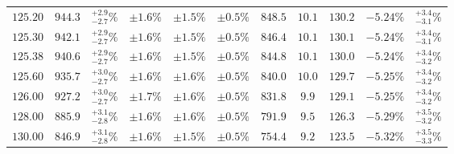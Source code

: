 \begin{table}[ht!]
{{\begin{tabular}{| cc | c | ccc | cccc | c |}
$125.20$ & $944.3$ & $^{+2.9}_{-2.7}\%$ & $\pm 1.6\%$ & {\color{black!55}$\pm 1.5\%$} & {\color{black!55}$\pm 0.5\%$} & $848.5$ & $10.1$ & $130.2$ & $-5.24\%$ & $^{+3.4}_{-3.1}\%$ \\
$125.30$ & $942.1$ & $^{+2.9}_{-2.7}\%$ & $\pm 1.6\%$ & {\color{black!55}$\pm 1.5\%$} & {\color{black!55}$\pm 0.5\%$} & $846.4$ & $10.1$ & $130.1$ & $-5.24\%$ & $^{+3.4}_{-3.1}\%$ \\
$125.38$ & $940.6$ & $^{+2.9}_{-2.7}\%$ & $\pm 1.6\%$ & {\color{black!55}$\pm 1.5\%$} & {\color{black!55}$\pm 0.5\%$} & $844.8$ & $10.1$ & $130.0$ & $-5.24\%$ & $^{+3.4}_{-3.2}\%$ \\
$125.60$ & $935.7$ & $^{+3.0}_{-2.7}\%$ & $\pm 1.6\%$ & {\color{black!55}$\pm 1.6\%$} & {\color{black!55}$\pm 0.5\%$} & $840.0$ & $10.0$ & $129.7$ & $-5.25\%$ & $^{+3.4}_{-3.2}\%$ \\
$126.00$ & $927.2$ & $^{+3.0}_{-2.7}\%$ & $\pm 1.7\%$ & {\color{black!55}$\pm 1.6\%$} & {\color{black!55}$\pm 0.5\%$} & $831.8$ & $9.9$ & $129.1$ & $-5.25\%$ & $^{+3.4}_{-3.2}\%$ \\
$128.00$ & $885.9$ & $^{+3.1}_{-2.8}\%$ & $\pm 1.6\%$ & {\color{black!55}$\pm 1.6\%$} & {\color{black!55}$\pm 0.5\%$} & $791.9$ & $9.5$ & $126.3$ & $-5.29\%$ & $^{+3.5}_{-3.2}\%$ \\
$130.00$ & $846.9$ & $^{+3.1}_{-2.8}\%$ & $\pm 1.6\%$ & {\color{black!55}$\pm 1.5\%$} & {\color{black!55}$\pm 0.5\%$} & $754.4$ & $9.2$ & $123.5$ & $-5.32\%$ & $^{+3.5}_{-3.3}\%$ \\
\cline{1-11}
\end{tabular}
}
}
\end{table}


